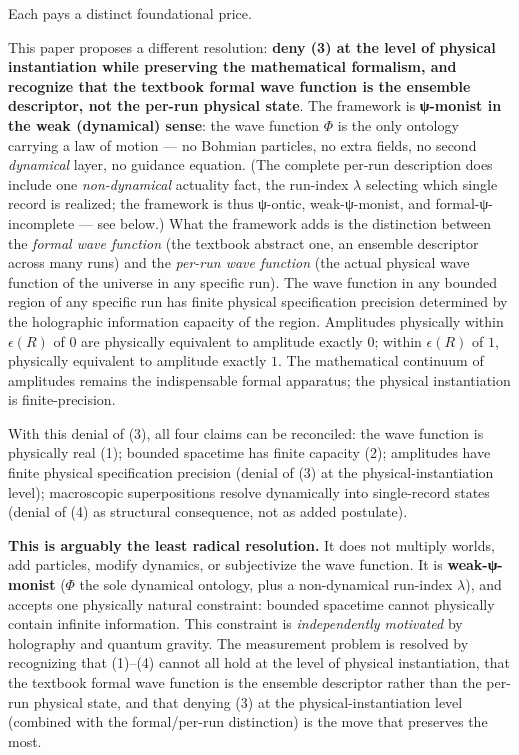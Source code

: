 \documentclass[11pt,a4paper]{article}
\begin{document}
Each pays a distinct foundational price.

This paper proposes a different resolution: \textbf{deny (3) at the level of physical instantiation while preserving the mathematical formalism, and recognize that the textbook formal wave function is the ensemble descriptor, not the per-run physical state}. The framework is \textbf{ψ-monist in the weak (dynamical) sense}: the wave function $\Phi$ is the only ontology carrying a law of motion — no Bohmian particles, no extra fields, no second \emph{dynamical} layer, no guidance equation. (The complete per-run description does include one \emph{non-dynamical} actuality fact, the run-index $\lambda$ selecting which single record is realized; the framework is thus ψ-ontic, weak-ψ-monist, and formal-ψ-incomplete — see below.) What the framework adds is the distinction between the \emph{formal wave function} (the textbook abstract one, an ensemble descriptor across many runs) and the \emph{per-run wave function} (the actual physical wave function of the universe in any specific run). The wave function in any bounded region of any specific run has finite physical specification precision determined by the holographic information capacity of the region. Amplitudes physically within $\epsilon(R)$ of $0$ are physically equivalent to amplitude exactly $0$; within $\epsilon(R)$ of $1$, physically equivalent to amplitude exactly $1$. The mathematical continuum of amplitudes remains the indispensable formal apparatus; the physical instantiation is finite-precision.

With this denial of (3), all four claims can be reconciled: the wave function is physically real (1); bounded spacetime has finite capacity (2); amplitudes have finite physical specification precision (denial of (3) at the physical-instantiation level); macroscopic superpositions resolve dynamically into single-record states (denial of (4) as structural consequence, not as added postulate).

\textbf{This is arguably the least radical resolution.} It does not multiply worlds, add particles, modify dynamics, or subjectivize the wave function. It is \textbf{weak-ψ-monist} ($\Phi$ the sole dynamical ontology, plus a non-dynamical run-index $\lambda$), and accepts one physically natural constraint: bounded spacetime cannot physically contain infinite information. This constraint is \emph{independently motivated} by holography and quantum gravity. The measurement problem is resolved by recognizing that (1)–(4) cannot all hold at the level of physical instantiation, that the textbook formal wave function is the ensemble descriptor rather than the per-run physical state, and that denying (3) at the physical-instantiation level (combined with the formal/per-run distinction) is the move that preserves the most.
\end{document}
